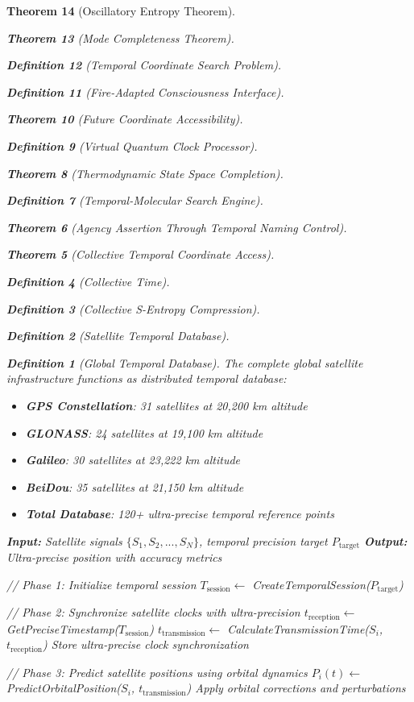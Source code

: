 \documentclass[12pt,a4paper]{article}
\newtheorem{theorem}{Theorem}[section]
\newtheorem{definition}[theorem]{Definition}
\begin{document}
\begin{theorem}[Oscillatory Entropy Theorem]
\begin{theorem}[Mode Completeness Theorem]
\begin{enumerate}
\begin{definition}[Temporal Coordinate Search Problem]
\begin{algorithm}
\begin{definition}[Fire-Adapted Consciousness Interface]
\begin{theorem}[Future Coordinate Accessibility]
\begin{definition}[Virtual Quantum Clock Processor]
\begin{itemize}
\begin{itemize}
\begin{theorem}[Thermodynamic State Space Completion]
\begin{definition}[Temporal-Molecular Search Engine]
\begin{theorem}[Agency Assertion Through Temporal Naming Control]
\begin{remark}
\begin{theorem}[Collective Temporal Coordinate Access]
\begin{definition}[Collective Time]
\begin{definition}[Collective S-Entropy Compression]
\begin{definition}[Satellite Temporal Database]
\begin{definition}[Global Temporal Database]
The complete global satellite infrastructure functions as distributed temporal database:
\begin{itemize}
\item \textbf{GPS Constellation}: 31 satellites at 20,200 km altitude
\item \textbf{GLONASS}: 24 satellites at 19,100 km altitude
\item \textbf{Galileo}: 30 satellites at 23,222 km altitude
\item \textbf{BeiDou}: 35 satellites at 21,150 km altitude
\item \textbf{Total Database}: 120+ ultra-precise temporal reference points
\end{itemize}
\end{definition}

\begin{algorithm}
\caption{Satellite Temporal Database Navigation}
\begin{algorithmic}
\State \textbf{Input:} Satellite signals $\{S_1, S_2, ..., S_N\}$, temporal precision target $P_{\text{target}}$
\State \textbf{Output:} Ultra-precise position with accuracy metrics

\State // Phase 1: Initialize temporal session
\State $T_{\text{session}} \leftarrow$ CreateTemporalSession($P_{\text{target}}$)

\State // Phase 2: Synchronize satellite clocks with ultra-precision
    \State $t_{\text{reception}} \leftarrow$ GetPreciseTimestamp($T_{\text{session}}$)
    \State $t_{\text{transmission}} \leftarrow$ CalculateTransmissionTime($S_i$, $t_{\text{reception}}$)
    \State Store ultra-precise clock synchronization
\EndFor

\State // Phase 3: Predict satellite positions using orbital dynamics
    \State $P_i(t) \leftarrow$ PredictOrbitalPosition($S_i$, $t_{\text{transmission}}$)
    \State Apply orbital corrections and perturbations
\EndFor


\end{algorithmic}
\end{algorithm}
\end{definition}
\end{definition}
\end{definition}
\end{theorem}
\end{remark}
\end{theorem}
\end{definition}
\end{theorem}
\end{itemize}
\end{itemize}
\end{definition}
\end{theorem}
\end{definition}
\end{algorithm}
\end{definition}
\end{enumerate}
\end{theorem}
\end{theorem}
\end{document}
